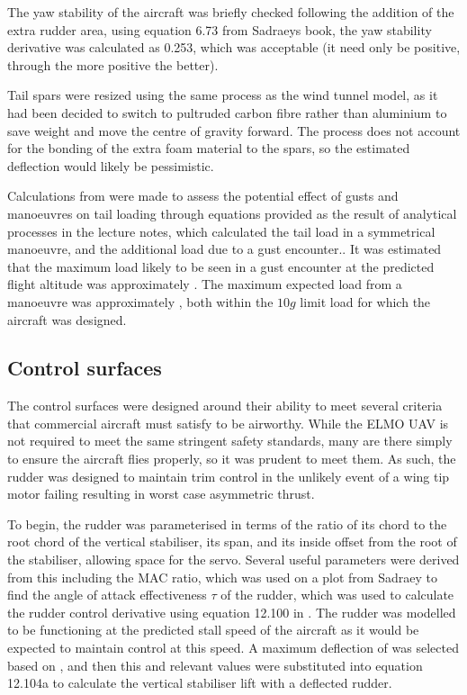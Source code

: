 \documentclass[../../main.tex]{subfiles}
\begin{document}
The yaw stability of the aircraft was briefly checked following the addition of the extra rudder area, using equation  6.73 from Sadraeys book, the yaw stability derivative was calculated as 0.253, which was acceptable (it need only be positive, through the more positive the better).

Tail spars were resized using the same process as the wind tunnel model, as it had been decided to switch to pultruded carbon fibre rather than aluminium to save weight and move the centre of gravity forward.
The process does not account for the bonding of the extra foam material to the spars, so the estimated deflection would likely be pessimistic.  

Calculations from \cite{bresloff-18} were made to assess the potential effect of gusts and manoeuvres on tail loading through equations provided as the result of analytical processes in the lecture notes, which calculated the tail load in a symmetrical manoeuvre, and the additional load due to a gust encounter..
It was estimated that the maximum load likely to be seen in a gust encounter at the predicted flight altitude was approximately .
The maximum expected load from a manoeuvre was approximately , both within the $10g$ limit load for which the aircraft was designed. 

\subsection{Control surfaces} \label{sec:design-process:revised-design:control-surfaces}

The control surfaces were designed around their ability to meet several criteria that commercial aircraft must satisfy to be airworthy.
While the ELMO UAV is not required to meet the same stringent safety standards, many are there simply to ensure the aircraft flies properly, so it was prudent to meet them.
As such, the rudder was designed to maintain trim control in the unlikely event of a wing tip motor failing resulting in worst case asymmetric thrust.  

To begin, the rudder was parameterised in terms of the ratio of its chord to the root chord of the vertical stabiliser, its span, and its inside offset from the root of the stabiliser, allowing space for the servo.
Several useful parameters were derived from this including the MAC ratio, which was used on a plot from Sadraey \cite{sadraey-13} to find the angle of attack effectiveness $\tau$ of the rudder, which was used to calculate the rudder control derivative using equation 12.100 in \cite{sadraey-13}.
The rudder was modelled to be functioning at the predicted stall speed of the aircraft as it would be expected to maintain control at this speed.
A maximum deflection of  was selected based on \cite{sadraey-13}, and then this and relevant values were substituted into equation 12.104a \cite{sadraey-13} to calculate the vertical stabiliser lift with a deflected rudder. 
\end{document}

